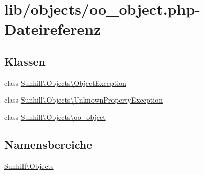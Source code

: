 \hypertarget{oo__object_8php}{}\section{lib/objects/oo\+\_\+object.php-\/\+Dateireferenz}
\label{oo__object_8php}
\subsection*{Klassen}
\begin{DoxyCompactItemize}
\item 
class \hyperlink{classSunhill_1_1Objects_1_1ObjectException}{Sunhill\textbackslash{}\+Objects\textbackslash{}\+Object\+Exception}
\item 
class \hyperlink{classSunhill_1_1Objects_1_1UnknownPropertyException}{Sunhill\textbackslash{}\+Objects\textbackslash{}\+Unknown\+Property\+Exception}
\item 
class \hyperlink{classSunhill_1_1Objects_1_1oo__object}{Sunhill\textbackslash{}\+Objects\textbackslash{}oo\+\_\+object}
\end{DoxyCompactItemize}
\subsection*{Namensbereiche}
\begin{DoxyCompactItemize}
\item 
 \hyperlink{namespaceSunhill_1_1Objects}{Sunhill\textbackslash{}\+Objects}
\end{DoxyCompactItemize}
